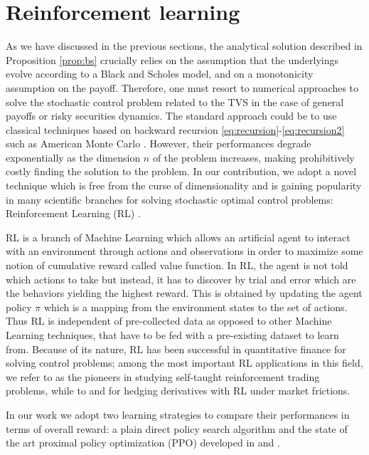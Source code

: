 \documentclass[runningheads]{m2ef}
\begin{document}
	\section{Reinforcement learning}\label{sec:RL}
	As we have discussed in the previous sections, the analytical solution described in Proposition \ref{prop:bs} crucially relies on the assumption that the underlyings evolve according to a Black and Scholes model, and on a monotonicity assumption on the payoff. Therefore,
	one must resort to numerical approaches to solve the stochastic control problem related to the TVS in the case of general payoffs or risky securities dynamics. The standard approach could be to use classical techniques based on backward recursion \eqref{eq:recursion}-\eqref{eq:recursion2} such as American Monte Carlo \cite{Longstaff2001}. However, their performances degrade exponentially as the dimension $n$ of the problem increases, making prohibitively costly finding the solution to the problem. In our contribution, we adopt a novel technique which is free from the curse of dimensionality and is gaining popularity in many scientific branches for solving stochastic optimal control problems: Reinforcement Learning (RL) \cite{Sutton2018}. 

	RL is a branch of Machine Learning which allows an artificial agent to interact with an environment through actions and observations in order to maximize some notion of cumulative reward called value function. In RL, the agent is not told which actions to take but instead, it has to discover by trial and error which are the behaviors  yielding the highest reward. This is obtained by updating the agent policy $\pi$ which is a mapping from the environment states to the set of actions. Thus RL is independent of pre-collected data as opposed to other Machine Learning techniques, that have to be fed with a pre-existing dataset to learn from. Because of its nature, RL has been successful in quantitative finance for solving control problems; among the most important RL applications in this field, we refer to \cite{Deng2017} as the pioneers in studying self-taught reinforcement trading problems, while to \cite{Halperin2020} and \cite{Kolm2019} for hedging derivatives with RL under market frictions.

	In our work we adopt two learning strategies to compare their performances in terms of overall reward: a plain direct policy search algorithm \cite{Sutton2018} and the state of the art proximal policy optimization (PPO) developed in \cite{Schulman2017} and \cite{Schulman2016}. 
\end{document}
